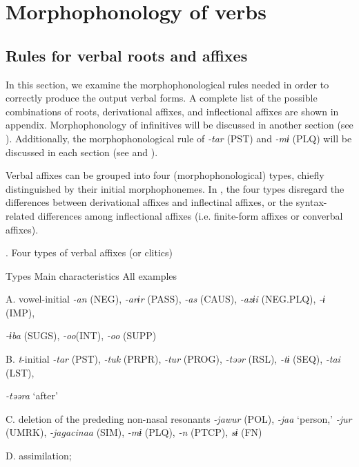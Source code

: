 \section{Morphophonology of verbs}
\label{bkm:Ref356245430}\subsection{Rules for verbal roots and affixes}

In this section, we examine the morphophonological rules needed in order to correctly produce the output verbal forms. A complete list of the possible combinations of roots, derivational affixes, and inflectional affixes are shown in appendix. Morphophonology of infinitives will be discussed in another section (see ). Additionally, the morphophonological rule of \textit{{}-tar} (PST) and \textit{{}-mɨ} (PLQ) will be discussed in each section (see  and ).

  Verbal affixes can be grouped into four (morphophonological) types, chiefly distinguished by their initial morphophonemes. In , the four types disregard the differences between derivational affixes and inflectinal affixes, or the syntax-related differences among inflectional affixes (i.e. finite-form affixes or converbal affixes).

\begin{styleBeschriftung}
\textmd{}\textmd{. Four types of verbal affixes (or clitics)}
\end{styleBeschriftung}

Types  Main characteristics  All examples

A.  vowel-initial  \textit{{}-an} (NEG), \textit{{}-arɨr} (PASS), \textit{{}-as} (CAUS), \textit{-azɨi} (NEG.PLQ), \textit{{}-ɨ} (IMP),

\textit{{}-ɨba} (SUGS), \textit{-oo}(INT), \textit{-oo} (SUPP)

B.  \textit{t}{}-initial  \textit{{}-tar} (PST), \textit{{}-tuk} (PRPR), \textit{{}-tur} (PROG), \textit{{}-təər} (RSL), \textit{{}-tɨ} (SEQ), \textit{{}-tai} (LST),

\textit{{}-təəra} ‘after’

C.  deletion of the prededing non-nasal resonants  \textit{{}-jawur} (POL), \textit{{}-jaa} ‘person,’ \textit{{}-jur} (UMRK), \textit{{}-jagacinaa} (SIM), \textit{{}-mɨ} (PLQ), \textit{{}-n} (PTCP), \textit{sɨ} (FN)

D.  assimilation;

